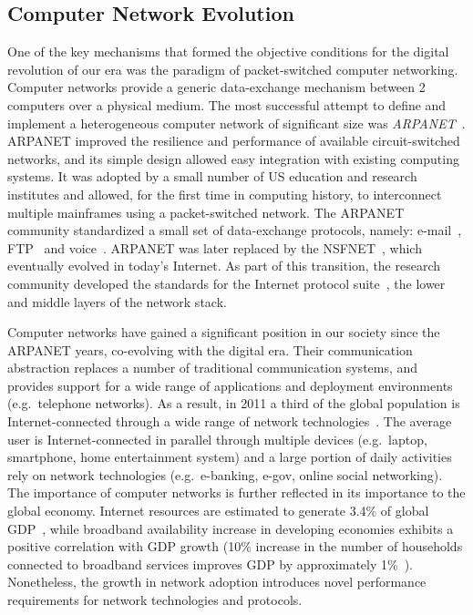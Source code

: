 \subsection{Computer Network Evolution}\label{sec:intro:net_evolution}

One of the key mechanisms that formed the objective conditions for the digital
revolution of our era was the paradigm of packet-switched computer networking.
Computer networks provide a generic data-exchange mechanism between 2 computers
over a physical medium.  The most successful attempt to define and implement a
heterogeneous computer network of significant size was
\textit{ARPANET}~. ARPANET improved the resilience and
performance of available circuit-switched networks, and its simple design
allowed easy integration with existing computing systems.  It was adopted by a small
number of US education and research institutes and allowed, for the first time
in computing history, to interconnect multiple mainframes using a
packet-switched network. The ARPANET community standardized a small set of
data-exchange protocols, namely: e-mail~, FTP~
and voice~. ARPANET was later replaced by the
NSFNET~, which eventually evolved in today's Internet.  As
part of this transition, the research community developed the standards for the
Internet protocol suite~, the
lower and middle layers of the network stack.

Computer networks have gained a significant position in our society since the
ARPANET years, co-evolving with the digital era.  Their communication
abstraction replaces a number of traditional communication systems, and
provides support for a wide range of applications and deployment environments
(e.g.~telephone networks).  As a result, in 2011 a third of the global
population is Internet-connected through a wide range of network
technologies~.  The average user is Internet-connected in
parallel through multiple devices (e.g.~laptop, smartphone, home entertainment
system) and a large portion of daily activities rely on network technologies
(e.g.~e-banking, e-gov, online social networking). The importance of computer
networks is further reflected in its importance to the global economy. Internet
resources are estimated to generate 3.4\% of global
GDP~, while broadband availability increase
in developing economies exhibits a positive correlation with GDP
growth (10\% increase in the number of households connected to broadband
services improves GDP by approximately 1\%~).  Nonetheless,
the growth in network adoption introduces novel performance requirements for
network technologies and protocols.

